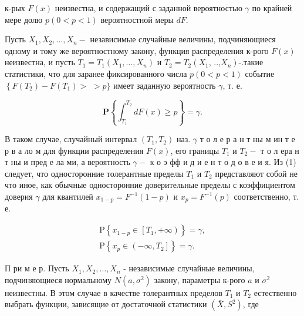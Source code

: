 \documentclass[10pt]{article}
\begin{document}
к-рых $F(x)$ неизвестна, и содержащий с заданной вероятностью $\gamma$ по крайней мере долю $p(0<p<1)$ вероятностной меры $d F$.



Пусть $X_{1}, X_{2}, \ldots, X_{n}-$ независимые случайные величины, подчиняющиеся одному и тому же вероятностному закону, функция распределения к-рого $F(x)$ неизвестна, и пусть $T_{1}=T_{1}\left(X_{1}, \ldots, X_{n}\right)$ и $T_{2}=T_{2}\left(X_{1}\right.$, ..,$\left.X_{n}\right)$-.такие статистики, что для заранее фиксированного числа $p(0<p<1)$ событие $\left\{F\left(T_{2}\right)-F\left(T_{1}\right)>\right.$ $>p\}$ имеет заданную вероятность $\gamma$, т. е.



\[

\mathbf{P}\left\{\int_{T_{1}}^{T_{2}} d F(x) \geqslant p\right\}=\gamma .

\]



В таком случае, случайный интервал $\left(T_{1}, T_{2}\right)$ наз. $\gamma$ т о л е р а н т ны м ин т е р в а ло м для функции распределения $F(x)$, его границы $T_{1}$ и $T_{2}-$ т о л ера н т ны и пред е ла ми, а вероятность $\gamma-$ к о э фф и д и е н т о д о в е и я. Из (1) следует, что односторонние толерантные пределы $T_{1}$ и $T_{2}$ представляют собой не что иное, как обычные односторонние доверительные пределы с коэффициентом доверия $\gamma$ для квантилей $x_{1-p}=F^{-1}(1-p)$ и $x_{p}=F^{-1}(p)$ соответственно, т. е.



\[

\begin{gathered}

\mathrm{P}\left\{x_{1-p} \in\left[T_{1},+\infty\right)\right\}=\gamma, \\

\mathrm{P}\left\{x_{p} \in\left(-\infty, T_{2}\right]\right\}=\gamma .

\end{gathered}

\]



П ри м е р. Пусть $X_{1}, X_{2}, \ldots, X_{n}$ - независимые случайные величины, подчиняющиеся нормальному $N\left(a, \sigma^{2}\right)$ закону, параметры к-рого $a$ и $\sigma^{2}$ неизвестны. В этом случае в качестве толерантных пределов $T_{1}$ и $T_{2}$ естественно выбрать функции, зависящие от достаточной статистики $\left(\bar{X}, S^{2}\right)$, где
\end{document}
